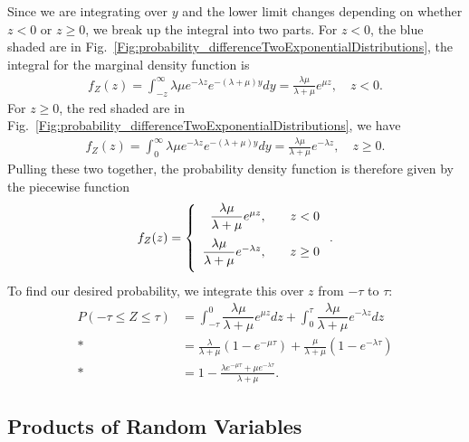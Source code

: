 Since we are integrating over $y$ and the lower limit changes depending on whether $z < 0$ or $z \ge 0$, we break up the integral into two parts. For $z < 0$, the blue shaded are in Fig.~\ref{Fig:probability_differenceTwoExponentialDistributions}, the integral for the marginal density function is
\begin{align}
  f_{Z}(z) =  \int_{-z}^\infty \lambda \mu e^{-\lambda z} e^{-(\lambda + \mu) y } dy = \frac{\lambda \mu}{\lambda + \mu }e^{\mu z}, \quad z < 0.
\end{align}
For $z \ge 0$, the red shaded are in Fig.~\ref{Fig:probability_differenceTwoExponentialDistributions}, we have
\begin{align}
  f_{Z}(z) =  \int_0^\infty \lambda \mu e^{-\lambda z} e^{-(\lambda + \mu) y } dy = \frac{\lambda \mu}{\lambda + \mu }e^{-\lambda z}, \quad z \ge 0.
\end{align}
Pulling these two together, the probability density function is therefore given by the piecewise function
\begin{align}
  f_{Z}(z) = \left\{ \begin{array}{r l}
  \dfrac{\lambda \mu}{\lambda + \mu }e^{\mu z},      & \quad z < 0   \vspace{0.2cm} \\
  \dfrac{\lambda \mu}{\lambda + \mu }e^{-\lambda z}, & \quad z \ge 0 \vspace{0.2cm} \\ \end{array} \right. .
\end{align}
To find our desired probability, we integrate this over $z$ from $-\tau$ to $\tau$:
\begin{align}
  P( -\tau \le Z \le \tau ) &= \int_{-\tau}^0 \dfrac{\lambda \mu}{\lambda + \mu }e^{\mu z} dz + \int_0^{\tau} \dfrac{\lambda \mu}{\lambda + \mu }e^{-\lambda z} dz \nonumber \\*
  &= \frac{\lambda}{\lambda + \mu} ( 1 - e^{-\mu \tau} ) + \frac{\mu}{\lambda + \mu} ( 1 - e^{-\lambda \tau} ) \nonumber \\*
  &= 1 - \frac{ \lambda e^{-\mu \tau} + \mu e^{-\lambda \tau} }{ \lambda + \mu } .
\end{align}

\subsection{Products of Random Variables}

